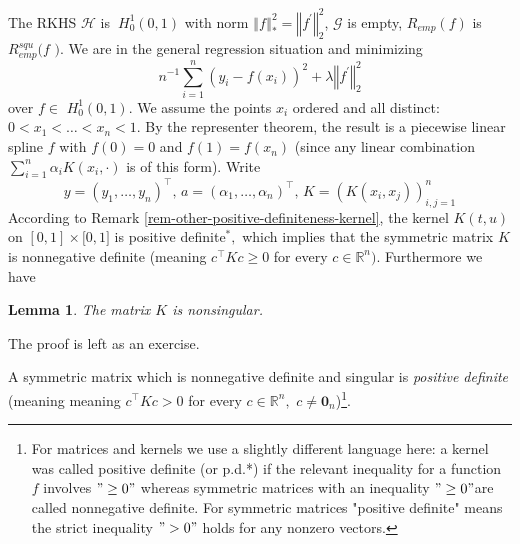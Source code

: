 \documentclass[11pt,twoside]{article}%
\theoremstyle{change}
\newtheorem{lemma}[theorem]{Lemma}
\begin{document}
The RKHS $\mathcal{H}$ is\textbf{\ }$H_{0}^{1}(0,1)$ with norm $\left\Vert
f\right\Vert _{\ast}^{2}=\left\Vert f^{\prime}\right\Vert _{2}^{2}$,
$\mathcal{G}$ is empty, $R_{emp}(f)$ is $R_{emp}^{squ}(f$ $)$. We are in the
general regression situation and minimizing
\begin{equation}
n^{-1}\sum_{i=1}^{n}\left(  y_{i}-f(x_{i})\right)  ^{2}+\lambda\left\Vert
f^{\prime}\right\Vert _{2}^{2}\label{linear-spline-objective-func}%
\end{equation}
over $f\in$ $H_{0}^{1}(0,1)$. We assume the points $x_{i}$ ordered and all
distinct: $0<x_{1}<\ldots<x_{n}<1$. By the representer theorem, the result is
a piecewise linear spline $f$ with $f(0)=0$ and $f(1)=f(x_{n})$ (since any
linear combination $\sum_{i=1}^{n}\alpha_{i}K\left(  x_{i},\cdot\right)  $ is
of this form). Write
\[
y=\left(  y_{1},\ldots,y_{n}\right)  ^{\top}\text{, }a=\left(  \alpha
_{1},\ldots,\alpha_{n}\right)  ^{\top}\text{, }K=\left(  K\left(  x_{i}%
,x_{j}\right)  \right)  _{i,j=1}^{n}%
\]
According to Remark \ref{rem-other-positive-definiteness-kernel}, the kernel
$K(t,u)$ on $[0,1]\times\lbrack0,1]$ is positive definite$^{\ast},$ which
implies that the symmetric matrix $K$ is nonnegative definite (meaning
$c^{\top}Kc\geq0$ for every $c\in\mathbb{R}^{n})$. Furthermore we have

\begin{lemma}
The matrix $K$ is nonsingular.
\end{lemma}

The proof is left as an exercise.

A symmetric matrix which is nonnegative definite and singular is
\textit{positive definite} (meaning meaning $c^{\top}Kc>0$ for every
$c\in\mathbb{R}^{n},$ $c\neq\mathbf{0}_{n}$)\footnote{For matrices and kernels
we use a slightly different language here: a kernel was called positive
definite (or p.d.*) if the relevant inequality for a function $f$ involves
$"\geq0"$ whereas symmetric matrices with an inequality $"\geq0"$are called
nonnegative definite. For symmetric matrices "positive definite" means the
strict inequality $">0"$ holds for any nonzero vectors.}.
\end{document}
